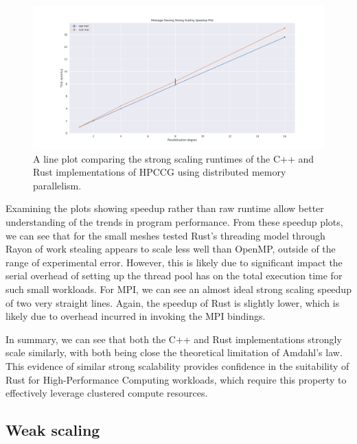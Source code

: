 \begin{figure}[H]
    \centering
    \includegraphics[width=\textwidth]{images/5_performance/scaling/strong_scaling_speedup_mpi.png}
    \caption{A line plot comparing the strong scaling runtimes of the C++ and Rust implementations of HPCCG using distributed memory parallelism.}
    \label{fig:strong_scaling_speedup_mpi}
\end{figure}


Examining the plots showing speedup rather than raw runtime allow better understanding of the trends in program performance. From these speedup plots, we can see that for the small meshes tested Rust's threading model through Rayon of work stealing appears to scale less well than OpenMP, outside of the range of experimental error. However, this is likely due to significant impact the serial overhead of setting up the thread pool has on the total execution time for such small workloads. For MPI, we can see an almost ideal strong scaling speedup of two very straight lines. Again, the speedup of Rust is slightly lower, which is likely due to overhead incurred in invoking the MPI bindings.

In summary, we can see that both the C++ and Rust implementations strongly scale similarly, with both being close the theoretical limitation of Amdahl's law. This evidence of similar strong scalability provides confidence in the suitability of Rust for High-Performance Computing workloads, which require this property to effectively leverage clustered compute resources.

\subsection{Weak scaling}
\label{ssec:weak-scaling}

